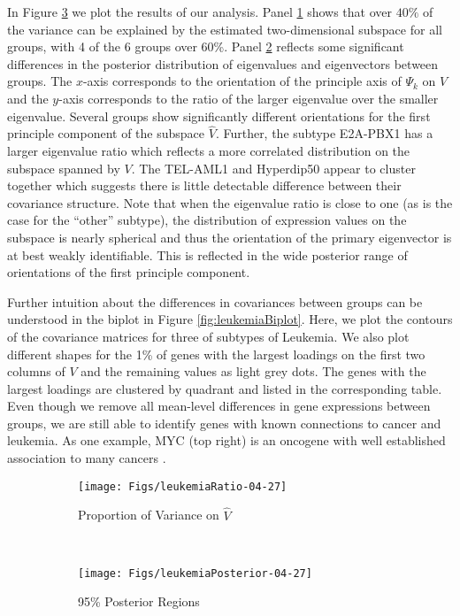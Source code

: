 \documentclass[12pt]{article}
\begin{document}
In Figure \ref{fig:leukemia} we plot the results of our analysis.
Panel \ref{fig:leukemiaRatio} shows that over $40\%$ of the variance
can be explained by the estimated two-dimensional subspace for all groups, with 4 of
the 6 groups over 60\%.  Panel \ref{fig:leukemiaPosterior} reflects some significant
differences in the posterior distribution of eigenvalues and
eigenvectors between groups.  The $x$-axis corresponds to the
orientation of the principle axis of $\Psi_k$ on $V$ and the $y$-axis
corresponds to the ratio of the larger eigenvalue over the smaller
eigenvalue.  Several groups show significantly different orientations
for the first principle component of the subspace $\hat{V}$.  Further,
the subtype E2A-PBX1 has a larger eigenvalue ratio which reflects a
more correlated distribution on the subspace spanned by $V$.  The
TEL-AML1 and Hyperdip50 appear to cluster together which suggests
there is little detectable difference between their covariance
structure.  Note that when the eigenvalue ratio is close to one (as is
the case for the ``other'' subtype), the distribution of expression
values on the subspace is nearly spherical and thus the orientation of
the primary eigenvector is at best weakly identifiable.  This is
reflected in the wide posterior range of orientations of the first
principle component.

Further intuition about the differences in covariances between groups
can be understood in the biplot in Figure \ref{fig:leukemiaBiplot}.
Here, we plot the contours of the covariance matrices for three of
subtypes of Leukemia.  We also plot different shapes for the 1\% of genes with
the largest loadings on the first two columns of $V$ and the
remaining values as light grey dots.  The genes with the largest
loadings are clustered by quadrant and listed in the corresponding
table.  Even though we remove all mean-level differences in gene
expressions between groups, we are still able to identify genes with
known connections to cancer and leukemia.  As one example, MYC (top
right) is an oncogene with well established association to many
cancers \citep{Dang2012}.

\begin{figure}[t]
    \centering
    \begin{subfigure}[b]{0.45\textwidth}
        \texttt{[image: Figs/leukemiaRatio-04-27]}
        \caption{Proportion of Variance on $\hat{V}$}
        \label{fig:leukemiaRatio}
    \end{subfigure}
    ~ %
    \begin{subfigure}[b]{0.45\textwidth}
        \texttt{[image: Figs/leukemiaPosterior-04-27]}
        \caption{95\% Posterior Regions }
        \label{fig:leukemiaPosterior}
    \end{subfigure}
\caption{}
\label{fig:leukemia}
\end{figure}
\end{document}
